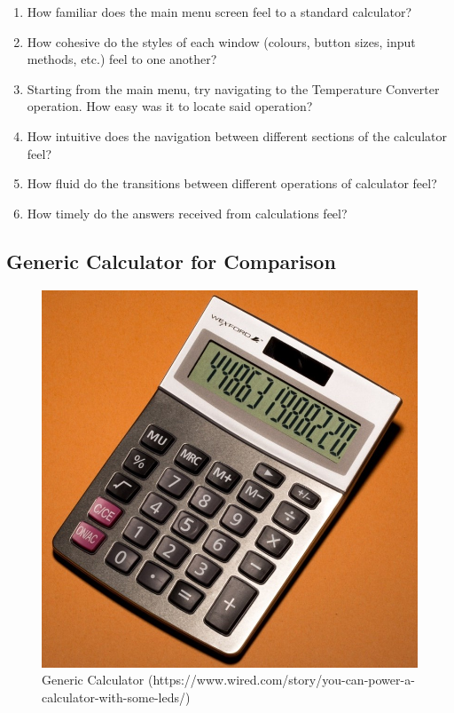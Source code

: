 \documentclass[12pt, titlepage]{article}
\begin{document}
\begin{enumerate}

\item How familiar does the main menu screen feel to a standard calculator?
    
\item How cohesive do the styles of each window (colours, button sizes, input methods, etc.) feel to one another?

\item Starting from the main menu, try navigating to the Temperature Converter operation. How easy was it to locate said operation?

\item How intuitive does the navigation between different sections of the calculator feel?

\item How fluid do the transitions between different operations of calculator feel?

\item How timely do the answers received from calculations feel? 

\end{enumerate}


\subsection{Generic Calculator for Comparison}

\begin{figure}[H]
    \centering
    \includegraphics[scale=0.7]{Calc.jpg}
    \caption{Generic Calculator (https://www.wired.com/story/you-can-power-a-calculator-with-some-leds/)}
    \label{calc}
\end{figure}
\end{document}
